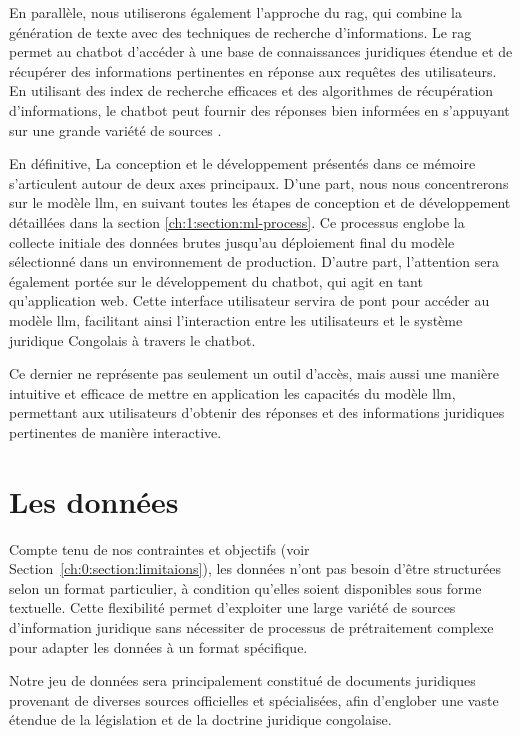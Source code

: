 En parallèle, nous utiliserons également l'approche du \ac{rag}, qui combine la génération de texte avec des techniques de recherche d'informations. Le \ac{rag} permet au chatbot d'accéder à une base de connaissances juridiques étendue et de récupérer des informations pertinentes en réponse aux requêtes des utilisateurs. En utilisant des index de recherche efficaces et des algorithmes de récupération d'informations, le chatbot peut fournir des réponses bien informées en s'appuyant sur une grande variété de sources \cite{lewis2021retrievalaugmented}.

En définitive, La conception et le développement présentés dans ce mémoire s'articulent autour de deux axes principaux. D'une part, nous nous concentrerons sur le modèle \ac{llm}, en suivant toutes les étapes de conception et de développement détaillées dans la section \ref{ch:1:section:ml-process}. Ce processus englobe la collecte initiale des données brutes jusqu'au déploiement final du modèle sélectionné dans un environnement de production. D'autre part, l'attention sera également portée sur le développement du chatbot, qui agit en tant qu'application web. Cette interface utilisateur servira de pont pour accéder au modèle \ac{llm}, facilitant ainsi l'interaction entre les utilisateurs et le système juridique Congolais à travers le chatbot. 

Ce dernier ne représente pas seulement un outil d'accès, mais aussi une manière intuitive et efficace de mettre en application les capacités du modèle \ac{llm}, permettant aux utilisateurs d'obtenir des réponses et des informations juridiques pertinentes de manière interactive.

\section{Les données}

Compte tenu de nos contraintes et objectifs (voir Section~\ref{ch:0:section:limitaions}), les données n'ont pas besoin d'être structurées selon un format particulier, à condition qu'elles soient disponibles sous forme textuelle. Cette flexibilité permet d'exploiter une large variété de sources d'information juridique sans nécessiter de processus de prétraitement complexe pour adapter les données à un format spécifique.

Notre jeu de données sera principalement constitué de documents juridiques provenant de diverses sources officielles et spécialisées, afin d'englober une vaste étendue de la législation et de la doctrine juridique congolaise.

